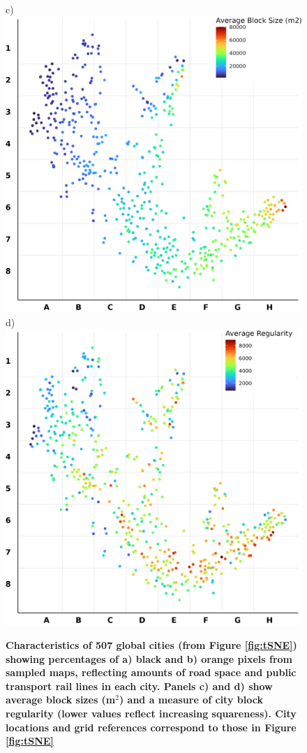 \documentclass[preprint,10pt]{elsarticle} %
\begin{document}
\begin{figure}
\\ \scriptsize{c)} \includegraphics[trim={ 0 0 0 0 },clip,scale=0.35]{Images/City_Types_Dimension_chessboard_AverageBlockSize.png}
\scriptsize{d)} \includegraphics[trim={ 0 0 0 0 },clip,scale=0.35]{Images/City_Types_Dimension_chessboard_AverageRegularity.png}
\caption{\bf Characteristics of 507 global cities (from Figure \ref{fig:tSNE}) showing percentages\cite{Thompson2020} of a) black and b) orange pixels from sampled maps, reflecting amounts of road space and public transport rail lines in each city. Panels c) and d) show\cite{Nice2019b} average block sizes (m$^{2}$) and a measure of city block regularity (lower values reflect increasing squareness). City locations and grid references correspond to those in Figure \ref{fig:tSNE}}
 \label{fig:Dimensions}
\end{figure}
\end{document}
